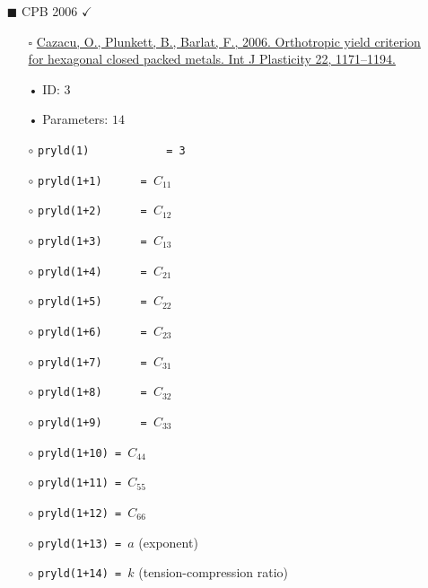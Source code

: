 \documentclass[11pt,a4paper,twoside,final,onecolumn,titlepage]{article}
\newcommand{\verified}{\hspace{0.5pt} {\LARGE $\checkmark$}}
\begin{document}
\newpage
\begin{itemize}
	\item[\tiny$\blacksquare$] CPB 2006 \verified{}
	\begin{itemize}
		\item[\tiny$\square$] {\small \href{https://doi.org/10.1016/j.ijplas.2005.06.001}{Cazacu, O., Plunkett, B., Barlat, F., 2006. Orthotropic yield criterion for hexagonal closed packed metals. Int J Plasticity 22, 1171–1194.}}\\
		\item[•] ID: $3$
		\item[•] Parameters: $14$\\
		\item[$\circ$] \texttt{pryld(1)\,\,\,\,\,\,\,\,\,\,\,\,= 3}
		\item[$\circ$] \texttt{pryld(1+1)\,\,\,\,\,\,= $C_{11}$}
		\item[$\circ$] \texttt{pryld(1+2)\,\,\,\,\,\,= $C_{12}$}
		\item[$\circ$] \texttt{pryld(1+3)\,\,\,\,\,\,= $C_{13}$}
		\item[$\circ$] \texttt{pryld(1+4)\,\,\,\,\,\,= $C_{21}$}
		\item[$\circ$] \texttt{pryld(1+5)\,\,\,\,\,\,= $C_{22}$}
		\item[$\circ$] \texttt{pryld(1+6)\,\,\,\,\,\,= $C_{23}$}
		\item[$\circ$] \texttt{pryld(1+7)\,\,\,\,\,\,= $C_{31}$}
		\item[$\circ$] \texttt{pryld(1+8)\,\,\,\,\,\,= $C_{32}$}
		\item[$\circ$] \texttt{pryld(1+9)\,\,\,\,\,\,= $C_{33}$}
		\item[$\circ$] \texttt{pryld(1+10) = $C_{44}$}
		\item[$\circ$] \texttt{pryld(1+11) = $C_{55}$}
		\item[$\circ$] \texttt{pryld(1+12) = $C_{66}$}
		\item[$\circ$] \texttt{pryld(1+13) = $a$} (exponent)
		\item[$\circ$] \texttt{pryld(1+14) = $k$} (tension-compression ratio)\\
	\end{itemize}
\end{itemize}
\end{document}

